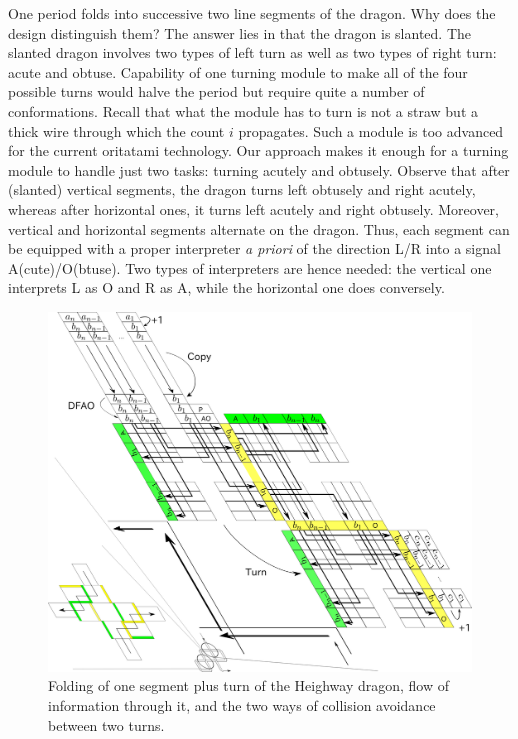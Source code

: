 One period folds into successive two line segments of the dragon. 
Why does the design distinguish them? 
The answer lies in that the dragon is slanted. 
The slanted dragon involves two types of left turn as well as two types of right turn: acute and obtuse. 
Capability of one turning module to make all of the four possible turns would halve the period but require quite a number of conformations. 
Recall that what the module has to turn is not a straw but a thick wire through which the count $i$ propagates. 
Such a module is too advanced for the current oritatami technology.  
Our approach makes it enough for a turning module to handle just two tasks: turning acutely and obtusely. 
Observe that after (slanted) vertical segments, the dragon turns left obtusely and right acutely, whereas after horizontal ones, it turns left acutely and right obtusely. 
Moreover, vertical and horizontal segments alternate on the dragon. 
Thus, each segment can be equipped with a proper interpreter \textit{a priori} of the direction L/R into a signal A(cute)/O(btuse).  
Two types of interpreters are hence needed: the vertical one interprets L as O and R as A, while the horizontal one does conversely. 

\begin{figure}[tb]
\centering
\includegraphics[width=0.8\linewidth]{pic/dragon_vol5.png}
\caption{
Folding of one segment plus turn of the Heighway dragon, flow of information through it, and the two ways of collision avoidance between two turns.
}
\label{fig:abst_dragon}
\end{figure}


